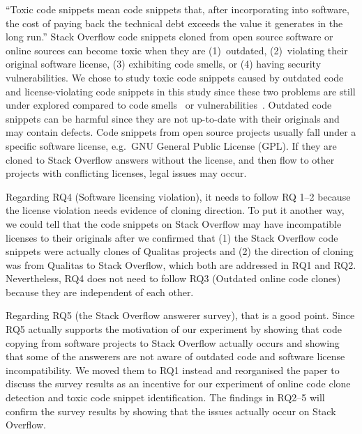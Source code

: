 \documentclass[a4paper,twoside,10pt]{reviewresponse}
\begin{document}
``Toxic code snippets mean code snippets that, after incorporating into
software, the cost of paying back the technical debt exceeds the value it
generates in the long run.'' Stack Overflow code snippets cloned from open
source software or online sources can become toxic when they are (1)~outdated,
(2)~violating their original software license, (3) exhibiting code smells, or
(4) having security vulnerabilities. We chose to study toxic code snippets
caused by outdated code and license-violating code snippets in this study since
these two problems are still under explored compared to code
smells~\citep{Tufano2015} or vulnerabilities~\citep{Acar2016,Fischer2017}.
Outdated code snippets can be harmful since they are not up-to-date with their
originals and may contain defects. Code snippets from open source projects
usually fall under a specific software license, e.g.\ GNU General Public License
(GPL). If they are cloned to Stack Overflow answers without the license, and
then flow to other projects with conflicting licenses, legal issues may occur.


Regarding RQ4 (Software licensing violation), it needs to follow RQ 1--2 because
the license violation needs evidence of cloning direction. To put it another
way, we could tell that the code snippets on Stack Overflow may have
incompatible licenses to their originals after we confirmed that (1) the Stack
Overflow code snippets were actually clones of Qualitas projects and (2) the
direction of cloning was from Qualitas to Stack Overflow, which both are
addressed in RQ1 and RQ2. Nevertheless, RQ4 does not need to follow RQ3
(Outdated online code clones) because they are independent of each other.

Regarding RQ5 (the Stack Overflow answerer survey), that is a good point. Since
RQ5 actually supports the motivation of our experiment by showing that code
copying from software projects to Stack Overflow actually occurs and showing
that some of the answerers are not aware of outdated code and software license
incompatibility. We moved them to RQ1 instead and reorganised the paper to
discuss the survey results as an incentive for our experiment of online code
clone detection and toxic code snippet identification. The findings in RQ2--5
will confirm the survey results by showing that the issues actually occur on
Stack Overflow.
\end{document}
